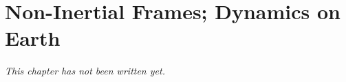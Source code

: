 \chapter{Non-Inertial Frames; Dynamics on Earth}\label{ch:b1:non-inertial-frames}


\emph{This chapter has not been written yet.}
